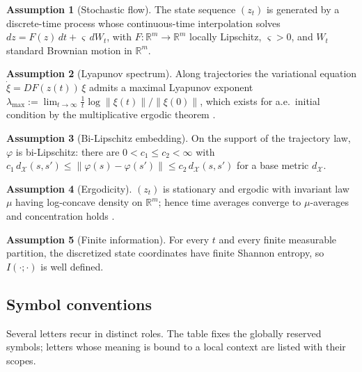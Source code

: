 \documentclass[11pt]{article}
\theoremstyle{plain}
\theoremstyle{definition}
\newtheorem{assumption}{Assumption}
\theoremstyle{remark}
\newcommand{\R}{\mathbb{R}}
\newcommand{\norm}[1]{\left\lVert#1\right\rVert}
\begin{document}
\begin{assumption}[Stochastic flow]\label{R:flow}
The state sequence $(z_t)$ is generated by a discrete-time process whose continuous-time interpolation solves $dz=F(z)\,dt+\varsigma\,dW_t$, with $F:\R^m\to\R^m$ locally Lipschitz, $\varsigma>0$, and $W_t$ standard Brownian motion in $\R^m$.
\end{assumption}

\begin{assumption}[Lyapunov spectrum]\label{R:lyap}
Along trajectories the variational equation $\dot\xi=DF(z(t))\,\xi$ admits a maximal Lyapunov exponent $\lambda_{\max}:=\lim_{t\to\infty}\tfrac1t\log\norm{\xi(t)}/\norm{\xi(0)}$, which exists for a.e.\ initial condition by the multiplicative ergodic theorem \citep{oseledets1968}.
\end{assumption}

\begin{assumption}[Bi-Lipschitz embedding]\label{R:embed}
On the support of the trajectory law, $\varphi$ is bi-Lipschitz: there are $0<c_1\le c_2<\infty$ with $c_1\,d_{\mathcal X}(s,s')\le\norm{\varphi(s)-\varphi(s')}\le c_2\,d_{\mathcal X}(s,s')$ for a base metric $d_{\mathcal X}$.
\end{assumption}

\begin{assumption}[Ergodicity]\label{R:ergodic}
$(z_t)$ is stationary and ergodic with invariant law $\mu$ having log-concave density on $\R^m$; hence time averages converge to $\mu$-averages \citep{birkhoff1931} and concentration holds \citep{bobkov2003}.
\end{assumption}

\begin{assumption}[Finite information]\label{R:mi}
For every $t$ and every finite measurable partition, the discretized state coordinates have finite Shannon entropy, so $I(\cdot;\cdot)$ is well defined.
\end{assumption}

\subsection{Symbol conventions}\label{sec:symbols}

Several letters recur in distinct roles. The table fixes the globally reserved symbols; letters whose meaning is bound to a local context are listed with their scopes.
\end{document}
